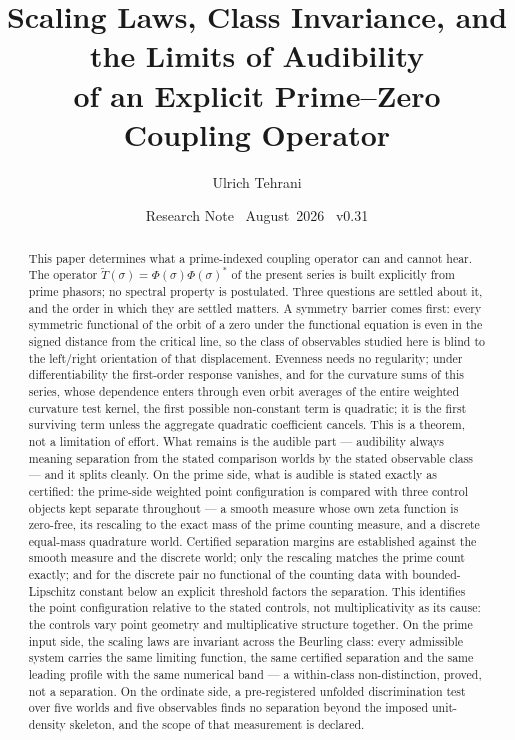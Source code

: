 \documentclass[11pt]{article}
\title{\vspace{-1.5em}\bfseries Scaling Laws, Class Invariance, and the
Limits of Audibility\\[0.4em]
\large of an Explicit Prime--Zero Coupling Operator}
\author{Ulrich Tehrani}
\date{Research Note \textperiodcentered\ August~2026
      \textperiodcentered\ v0.31}
\newcommand{\Tt}{\widetilde{T}}
\begin{document}
\maketitle

\begin{abstract}
This paper determines what a prime-indexed coupling operator can and cannot
hear. The operator $\Tt(\sigma)=\Phi(\sigma)\Phi(\sigma)^*$ of the present
series is built explicitly from prime phasors; no spectral property is
postulated. Three questions are settled about it, and the order in which they
are settled matters. A symmetry barrier comes first: every symmetric
functional of the orbit of a zero under the functional equation is even in the
signed distance from the critical line, so the class of observables studied
here is blind to the left/right orientation of that displacement. Evenness
needs no regularity; under differentiability the first-order response
vanishes, and for the curvature sums of this series, whose dependence enters
through even orbit averages of the entire weighted curvature test kernel, the
first
possible non-constant term is quadratic; it is the first surviving term unless the
aggregate quadratic coefficient cancels. This is a theorem, not a limitation
of effort. What
remains is the audible part --- audibility always meaning separation from
the stated comparison worlds by the stated observable class --- and it splits
cleanly. On the prime side, what
is audible is stated exactly as certified: the prime-side weighted point
configuration is compared with three control objects kept separate
throughout --- a smooth measure whose own zeta function is zero-free, its
rescaling to the exact mass of the prime counting measure, and a discrete
equal-mass quadrature world. Certified separation margins are established
against the smooth measure and the discrete world; only the rescaling
matches the prime count exactly;
and for the discrete pair no functional of the counting data with
bounded-Lipschitz constant below an explicit threshold factors the
separation. This identifies the point configuration relative to the stated
controls, not multiplicativity as its cause: the controls vary point geometry
and multiplicative structure together. On the prime input side, the scaling laws are invariant across the Beurling
class: every admissible system carries the same limiting function, the same
certified separation and the same leading profile with the same numerical
band --- a within-class non-distinction, proved, not a separation. On the
ordinate side, a pre-registered unfolded discrimination test over five worlds
and five observables finds no separation beyond the imposed unit-density
skeleton, and the scope of that measurement is declared.


\end{abstract}
\end{document}
